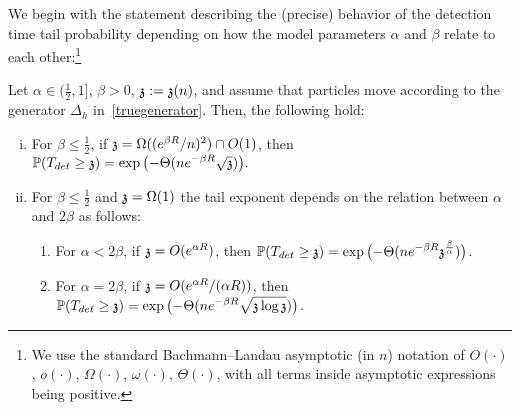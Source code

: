 \smallskip
We begin with the statement describing the (precise) behavior of the detection time tail probability depending on how the model parameters $\alpha$ and $\beta$ relate to each other:\footnote{We use the standard Bachmann--Landau asymptotic (in $n$) notation of $O(\cdot)$, $o(\cdot)$, $\Omega(\cdot)$, $\omega(\cdot)$, $\Theta(\cdot)$,  with all terms inside asymptotic expressions being positive.}
\begin{theorem}\label{thm:intro-mixed}
Let $\alpha\in (\frac12,1]$, $\beta >0$,  $\ss:=\ss(n)$, and assume that particles move according to the generator 
$\Delta_h$ in~\eqref{truegenerator}.
Then, the following hold:
\begin{enumerate}[(i)]
    \item\label{thm:mixed-itm-ssmall} 
    For $\beta\leq\frac12$, if $\ss=\Omega((e^{\beta R}/n)^2)\cap O(1)$, then
$\displaystyle
\PP (T_{det} \ge \ss)=\exp\big({-}\Theta(ne^{-\beta R}\sqrt{\ss})\big).\label{ssmall}
$
\smallskip
\item
For $\beta\leq\frac12$ and $\ss=\Omega(1)$ the tail exponent depends on the relation between $\alpha$ and $2\beta$ as follows: 
\begin{enumerate}
    \item\label{thm:mixed-itm1}
    For $\alpha<2\beta$, if $\ss=O(e^{\alpha R})$, then 
    $\displaystyle \PP (T_{det} \ge \ss)=\exp\big({-}\Theta(n e^{-\beta R}\ss^{\frac{\beta}{\alpha}})\big)$.
    
    \smallskip    
    \item\label{thm:mixed-itm2} 
    For $\alpha=2\beta$, if $\ss=O(e^{\alpha R}/(\alpha R))$, then $\displaystyle\PP (T_{det} \ge \ss)=\exp\big({-}\Theta(ne^{-\beta R}\sqrt{\ss\log\ss})\big)$.


\end{enumerate}
\end{enumerate}
\end{theorem}
